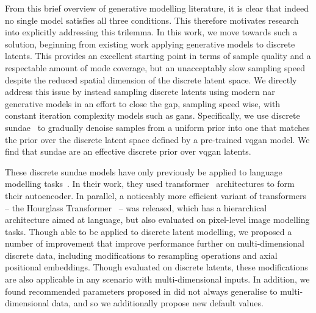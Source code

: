 From this brief overview of generative modelling literature, it is clear that
indeed no single model satisfies all three conditions. This therefore motivates
research into explicitly addressing this trilemma. In this work, we move towards
such a solution, beginning from existing work applying generative models to
discrete latents. This provides an excellent starting point in terms of sample
quality and a respectable amount of mode coverage, but an unacceptably slow
sampling speed despite the reduced spatial dimension of the discrete latent
space. We directly address this issue by instead sampling discrete latents using
modern \gls{nar} generative models in an effort to close the gap, sampling speed
wise, with constant iteration complexity models such as \glspl{gan}.
Specifically, we use discrete \gls{sundae}~\cite{savinov2022stepunrolled} to
gradually denoise samples from a uniform prior into one that matches the prior
over the discrete latent space defined by a pre-trained \gls{vqgan} model. We find
that \gls{sundae} are an effective discrete prior over \gls{vqgan} latents.

These discrete \gls{sundae} models have only previously be applied to language
modelling tasks~\cite{savinov2022stepunrolled}. In their work, they used
transformer~\cite{vaswani2017attention} architectures to form their autoencoder.
In parallel, a noticeably more efficient variant of transformers -- the
Hourglass Transformer~\cite{nawrot2021hierarchical} -- was released, which has a
hierarchical architecture aimed at language, but also evaluated on pixel-level
image modelling tasks. Though able to be applied to discrete latent modelling,
we proposed a number of improvement that improve performance further on
multi-dimensional discrete data, including modifications to resampling
operations and axial positional embeddings. Though evaluated on discrete
latents, these modifications are also applicable in any scenario with
multi-dimensional inputs. In addition, we found recommended parameters proposed
in \citet{savinov2022stepunrolled} did not always generalise to
multi-dimensional data, and so we additionally propose new default values.


